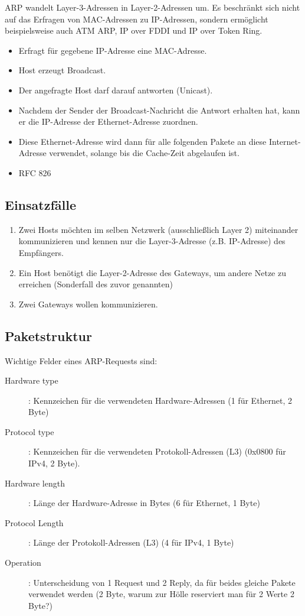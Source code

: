 \documentclass{article} %
\begin{document}

ARP wandelt Layer-3-Adressen in Layer-2-Adressen um.
Es beschränkt sich nicht auf das Erfragen von MAC-Adressen zu IP-Adressen, sondern ermöglicht beispielsweise auch ATM ARP, IP over FDDI und IP over Token Ring.
\begin{itemize}
	\item Erfragt für gegebene IP-Adresse eine MAC-Adresse.
	\item Host erzeugt Broadcast.
	\item Der angefragte Host darf darauf antworten (Unicast).
	\item Nachdem der Sender der Broadcast-Nachricht die Antwort erhalten hat, kann er die IP-Adresse der Ethernet-Adresse zuordnen.
	\item Diese Ethernet-Adresse wird dann für alle folgenden Pakete an diese Internet-Adresse verwendet, solange bis die Cache-Zeit abgelaufen ist.
	\item RFC 826 \cite{rfc826}
\end{itemize}

\subsection{Einsatzfälle}

\begin{enumerate}
	\item Zwei Hosts möchten im selben Netzwerk (ausschließlich Layer 2) miteinander kommunizieren und kennen nur die Layer-3-Adresse (z.B. IP-Adresse) des Empfängers.
	\item Ein Host benötigt die Layer-2-Adresse des Gateways, um andere Netze zu erreichen (Sonderfall des zuvor genannten)
	\item Zwei Gateways wollen kommunizieren.
\end{enumerate}

\subsection{Paketstruktur}
Wichtige Felder eines ARP-Requests sind:
\begin{description}
	\item[Hardware type]: Kennzeichen für die verwendeten Hardware-Adressen (1 für Ethernet, 2 Byte)
	\item[Protocol type]: Kennzeichen für die verwendeten Protokoll-Adressen (L3) (0x0800 für IPv4, 2 Byte).
	\item[Hardware length]: Länge der Hardware-Adresse in Bytes (6 für Ethernet, 1 Byte)
	\item[Protocol Length]: Länge der Protokoll-Adressen (L3) (4 für IPv4, 1 Byte)
	\item[Operation]: Unterscheidung von 1 Request und 2 Reply, da für beides gleiche Pakete verwendet werden (2 Byte, warum zur Hölle reserviert man für 2 Werte 2 Byte?)
\end{description}
\end{document}
